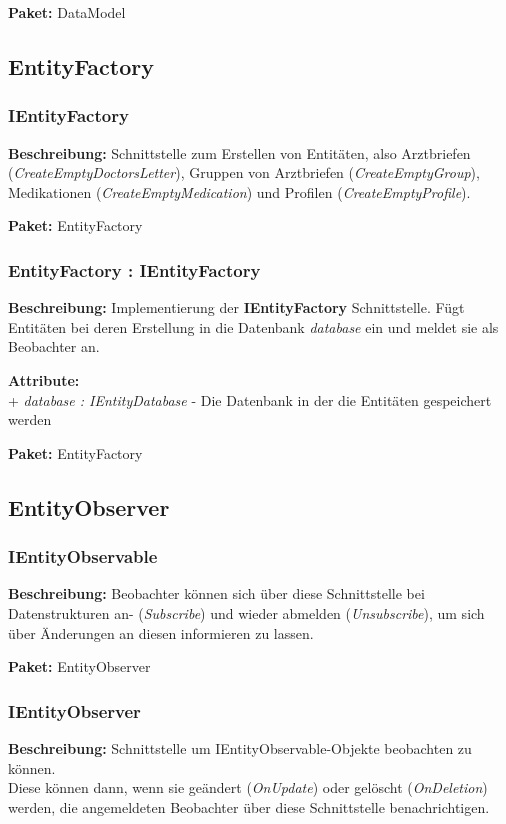 \documentclass[a4paper]{scrreprt}
\begin{document}
\textbf{Paket:} DataModel

\subsection{EntityFactory}

\subsubsection{IEntityFactory}
\textbf{Beschreibung:} Schnittstelle zum Erstellen von Entitäten, also Arztbriefen (\textit{CreateEmptyDoctorsLetter}), Gruppen von Arztbriefen (\textit{CreateEmptyGroup}), Medikationen (\textit{CreateEmptyMedication}) und Profilen (\textit{CreateEmptyProfile}).

\textbf{Paket:} EntityFactory

\subsubsection{EntityFactory : IEntityFactory}
\textbf{Beschreibung:} Implementierung der \textbf{IEntityFactory} Schnittstelle. Fügt Entitäten bei deren Erstellung in die Datenbank \textit{database} ein und meldet sie als Beobachter an.

\textbf{Attribute:}\\
+ \textit{database : IEntityDatabase} - Die Datenbank in der die Entitäten gespeichert werden

\textbf{Paket:} EntityFactory


\subsection{EntityObserver}

\subsubsection{IEntityObservable}
\textbf{Beschreibung:} Beobachter können sich über diese Schnittstelle bei Datenstrukturen an- (\textit{Subscribe}) und wieder abmelden (\textit{Unsubscribe}), um sich über Änderungen an diesen informieren zu lassen.

\textbf{Paket:} EntityObserver

\subsubsection{IEntityObserver}
\textbf{Beschreibung:} Schnittstelle um IEntityObservable-Objekte beobachten zu können. \\
Diese können dann, wenn sie geändert (\textit{OnUpdate}) oder gelöscht (\textit{OnDeletion}) werden, die angemeldeten Beobachter über diese Schnittstelle benachrichtigen.
\end{document}
